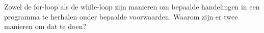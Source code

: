 Zowel de for-loop als de while-loop zijn manieren om bepaalde handelingen in een programma te herhalen onder bepaalde voorwaarden. Waarom zijn er twee manieren om dat te doen?

